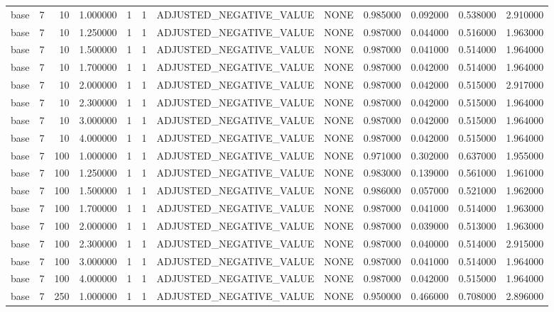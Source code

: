\begin{tabular}{lrrrllllrrrr}
base & 7 & 10 & 1.000000 & 1 & 1 & ADJUSTED_NEGATIVE_VALUE & NONE & 0.985000 & 0.092000 & 0.538000 & 2.910000 \\
base & 7 & 10 & 1.250000 & 1 & 1 & ADJUSTED_NEGATIVE_VALUE & NONE & 0.987000 & 0.044000 & 0.516000 & 1.963000 \\
base & 7 & 10 & 1.500000 & 1 & 1 & ADJUSTED_NEGATIVE_VALUE & NONE & 0.987000 & 0.041000 & 0.514000 & 1.964000 \\
base & 7 & 10 & 1.700000 & 1 & 1 & ADJUSTED_NEGATIVE_VALUE & NONE & 0.987000 & 0.042000 & 0.514000 & 1.964000 \\
base & 7 & 10 & 2.000000 & 1 & 1 & ADJUSTED_NEGATIVE_VALUE & NONE & 0.987000 & 0.042000 & 0.515000 & 2.917000 \\
base & 7 & 10 & 2.300000 & 1 & 1 & ADJUSTED_NEGATIVE_VALUE & NONE & 0.987000 & 0.042000 & 0.515000 & 1.964000 \\
base & 7 & 10 & 3.000000 & 1 & 1 & ADJUSTED_NEGATIVE_VALUE & NONE & 0.987000 & 0.042000 & 0.515000 & 1.964000 \\
base & 7 & 10 & 4.000000 & 1 & 1 & ADJUSTED_NEGATIVE_VALUE & NONE & 0.987000 & 0.042000 & 0.515000 & 1.964000 \\
base & 7 & 100 & 1.000000 & 1 & 1 & ADJUSTED_NEGATIVE_VALUE & NONE & 0.971000 & 0.302000 & 0.637000 & 1.955000 \\
base & 7 & 100 & 1.250000 & 1 & 1 & ADJUSTED_NEGATIVE_VALUE & NONE & 0.983000 & 0.139000 & 0.561000 & 1.961000 \\
base & 7 & 100 & 1.500000 & 1 & 1 & ADJUSTED_NEGATIVE_VALUE & NONE & 0.986000 & 0.057000 & 0.521000 & 1.962000 \\
base & 7 & 100 & 1.700000 & 1 & 1 & ADJUSTED_NEGATIVE_VALUE & NONE & 0.987000 & 0.041000 & 0.514000 & 1.963000 \\
base & 7 & 100 & 2.000000 & 1 & 1 & ADJUSTED_NEGATIVE_VALUE & NONE & 0.987000 & 0.039000 & 0.513000 & 1.963000 \\
base & 7 & 100 & 2.300000 & 1 & 1 & ADJUSTED_NEGATIVE_VALUE & NONE & 0.987000 & 0.040000 & 0.514000 & 2.915000 \\
base & 7 & 100 & 3.000000 & 1 & 1 & ADJUSTED_NEGATIVE_VALUE & NONE & 0.987000 & 0.041000 & 0.514000 & 1.964000 \\
base & 7 & 100 & 4.000000 & 1 & 1 & ADJUSTED_NEGATIVE_VALUE & NONE & 0.987000 & 0.042000 & 0.515000 & 1.964000 \\
base & 7 & 250 & 1.000000 & 1 & 1 & ADJUSTED_NEGATIVE_VALUE & NONE & 0.950000 & 0.466000 & 0.708000 & 2.896000 \\

\end{tabular}

